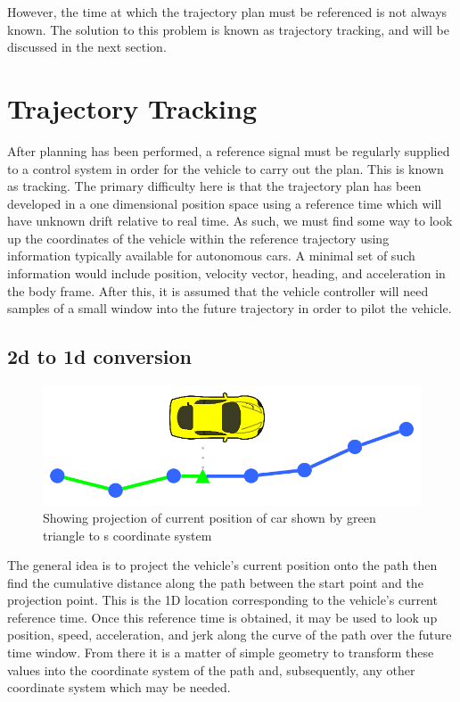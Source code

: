 \documentclass[letterpaper, 10 pt, conference]{ieeeconf}  %
\begin{document}
However, the time at which the trajectory plan must be referenced is not always known.
The solution to this problem is known as trajectory tracking, and will be discussed in the next section.


\section{Trajectory Tracking} \label{sec:trajectorytracking}

After planning has been performed, a reference signal must be regularly supplied to a control system in order for the vehicle to carry out the plan.
This is known as tracking.
The primary difficulty here is that the trajectory plan has been developed in a one dimensional position space using a reference time which will have unknown drift relative to real time.
As such, we must find some way to look up the coordinates of the vehicle within the reference trajectory using information typically available for autonomous cars.
A minimal set of such information would include position, velocity vector, heading, and acceleration in the body frame.
After this, it is assumed that the vehicle controller will need samples of a small window into the future trajectory in order to pilot the vehicle.

\subsection{2d to 1d conversion}

\begin{figure}[thpb]
  \centering
  \includegraphics[width=0.5\columnwidth]{graphics/PathProjection.png}
  \caption{Showing projection of current position of car shown by green triangle to s coordinate system}
  \label{fig:cartos}
\end{figure}

The general idea is to project the vehicle's current position onto the path then find the cumulative distance along the path between the start point and the projection point.
This is the 1D location corresponding to the vehicle's current reference time.
Once this reference time is obtained, it may be used to look up position, speed, acceleration, and jerk along the curve of the path over the future time window.
From there it is a matter of simple geometry to transform these values into the coordinate system of the path and, subsequently, any other coordinate system which may be needed.
\end{document}
